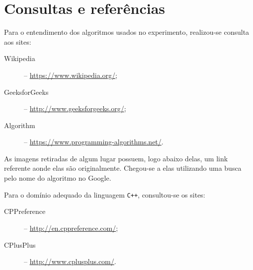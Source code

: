 \chapter{Consultas e referências}
Para o entendimento dos algoritmos usados no experimento, realizou-se consulta aos sites:

\begin{description}
	\item[Wikipedia] -- \url{https://www.wikipedia.org/};
	\item[GeeksforGeeks] -- \url{http://www.geeksforgeeks.org/};
	\item[Algorithm] -- \url{https://www.programming-algorithms.net/}.
\end{description}

As imagens retiradas de algum lugar possuem, logo abaixo delas, um link referente aonde elas são originalmente. Chegou-se a elas utilizando uma busca pelo nome do algoritmo no Google.

Para o domínio adequado da linguagem \texttt{C++}, consultou-se os sites:

\begin{description}
	\item[CPPreference] -- \url{http://en.cppreference.com/};
	\item[CPlusPlus] -- \url{http://www.cplusplus.com/}.
\end{description}